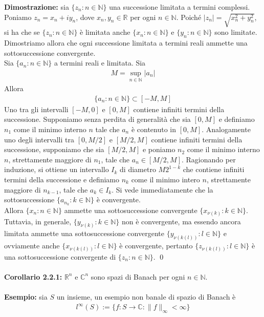 \documentclass{article}
\numberwithin{equation}{subsection}
\begin{document}
\textbf{Dimostrazione:} sia $\{z_n : n \in \mathbb{N}\}$ una successione limitata a termini complessi. Poniamo $z_n = x_n + iy_n$, dove $x_n, y_n \in \mathbb{R}$ per ogni $n \in \mathbb{N}$. Poiché $|z_n| = \sqrt{x^2_n + y^2_n}$, si ha che se $\{z_n : n \in \mathbb{N}\}$ è limitata anche $\{x_n : n \in \mathbb{N}\}$ e $\{y_n : n \in \mathbb{N}\}$ sono limitate. Dimostriamo allora che ogni successione limitata a termini reali ammette una sottosuccessione convergente. \\
Sia $\{a_n : n \in \mathbb{N}\}$ a termini reali e limitata. Sia
\begin{align*}
    M = \sup_{n \in \mathbb{N}}|a_n| 
\end{align*}
Allora
\begin{align*}
    \{a_n : n \in \mathbb{N}\} \subset [-M, M] 
\end{align*}
Uno tra gli intervalli $[-M, 0]$ e $[0, M]$ contiene infiniti termini della successione. Supponiamo senza perdita di generalità che sia $[0, M]$ e definiamo $n_1$ come il minimo interno $n$ tale che $a_n$ è contenuto in $[0, M]$. Analogamente uno degli intervalli tra $[0, M/2]$ e $[M/2, M]$ contiene infiniti termini della successione, supponiamo che sia $[M/2, M]$ e poniamo $n_2$ come il minimo interno $n$, strettamente maggiore di $n_1$, tale che $a_n \in [M/2, M]$. Ragionando per induzione, si ottiene un intervallo $I_k$ di diametro $M2^{1 - k}$ che contiene infiniti termini della successione e definiamo $n_k$ come il minimo intero $n$, strettamente maggiore di $n_{k - 1}$, tale che $a_k \in I_k$. Si vede immediatamente che la sottosuccessione $\{a_{n_k} : k \in \mathbb{N}\}$ è convergente. \\
Allora $\{x_n : n \in \mathbb{N}\}$ ammette una sottosuccessione convergente $\{x_{\nu(k)} : k \in \mathbb{N}\}$. Tuttavia, in generale, $\{y_{\nu(k)} : k \in \mathbb{N}\}$ non è convergente, ma essendo ancora limitata ammette una sottosuccessione convergente $\{y_{\nu(k(l))} : l \in \mathbb{N}\}$ e ovviamente anche $\{x_{\nu(k(l))} : l \in \mathbb{N}\}$ è convergente, pertanto $\{z_{\nu(k(l))} : l \in \mathbb{N}\}$ è una sottosuccessione convergente di $\{z_n : n \in \mathbb{N}\}$. \qed \\ \\
\textbf{Corollario 2.2.1:} $\mathbb{R}^n$ e $\mathbb{C}^n$ sono spazi di Banach per ogni $n \in \mathbb{N}$. \\ \\
\textbf{Esempio:} sia $S$ un insieme, un esempio non banale di spazio di Banach è
\begin{align*}
    l^\infty(S) := \{f : S \longrightarrow \mathbb{C} : \|f\|_\infty < \infty\} 
\end{align*}
\end{document}
